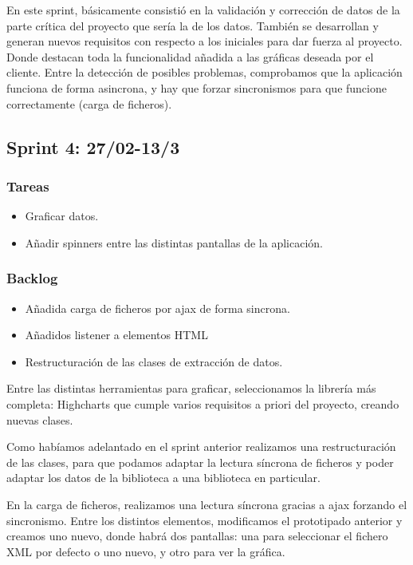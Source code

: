 En este sprint, básicamente consistió en la validación y corrección de datos de la parte crítica del proyecto que sería la de los datos.
También se desarrollan y generan nuevos requisitos con respecto a los iniciales para dar fuerza al proyecto. Donde destacan toda la funcionalidad añadida a las gráficas deseada por el cliente. 
Entre la detección de posibles problemas, comprobamos que la aplicación funciona de forma asincrona, y hay que forzar sincronismos para que funcione correctamente (carga de ficheros).

\subsection{Sprint 4: 27/02-13/3}
\subsubsection{Tareas}
\begin{itemize}
	\item Graficar datos.

	\item Añadir spinners entre las distintas pantallas de la aplicación.

\end{itemize}

\subsubsection{Backlog}
\begin{itemize}
	\item Añadida carga de ficheros por ajax de forma sincrona.

	\item Añadidos listener a elementos HTML

	\item Restructuración de las clases de extracción de datos.

\end{itemize}

Entre las distintas herramientas para graficar, seleccionamos la librería más completa: Highcharts que cumple varios requisitos a priori del proyecto, creando nuevas clases.

Como habíamos adelantado en el sprint anterior realizamos una restructuración de las clases, para que podamos adaptar la lectura síncrona de ficheros y poder adaptar los datos de la biblioteca a una biblioteca en particular.

En la carga de ficheros, realizamos una lectura síncrona gracias a ajax forzando el sincronismo.
Entre los distintos elementos, modificamos el prototipado anterior y creamos uno nuevo, donde habrá dos pantallas: una para seleccionar el fichero XML por defecto o uno nuevo, y otro para ver la gráfica. 

